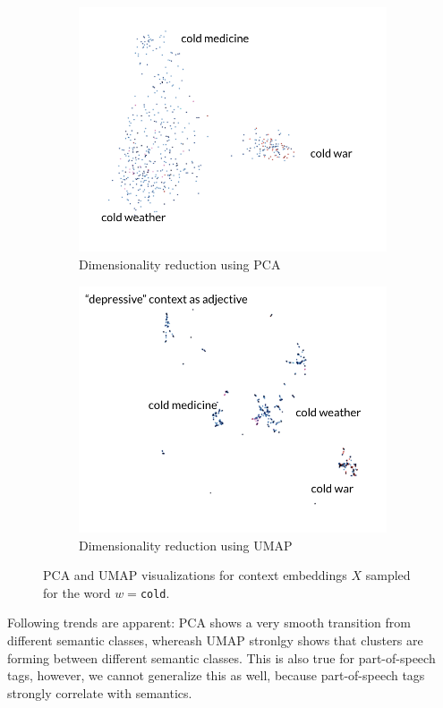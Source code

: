 \documentclass[a4paper,12pt,twoside,openright]{report}
\begin{document}
\begin{figure}[H]
\begin{subfigure}{.45\textwidth}
  \centering
  \includegraphics[width=.8\linewidth]{./assets/analysis/cold_pca.png}
  \caption{Dimensionality reduction using PCA}
  \label{fig:sfig1}
\end{subfigure}%
\hfill
\begin{subfigure}{.45\textwidth}
  \centering
  \includegraphics[width=.8\linewidth]{./assets/analysis/cold_umap.png}
  \caption{Dimensionality reduction using UMAP}
  \label{fig:sfig2}
\end{subfigure}
\caption{PCA and UMAP visualizations for context embeddings $X$ sampled for the word $w=$\texttt{cold}. }
\label{fig:cold_tensorboard}
\end{figure}


Following trends are apparent: 
PCA shows a very smooth transition from different semantic classes, whereash UMAP stronlgy shows that clusters are forming between different semantic classes.
This is also true for part-of-speech tags, however, we cannot generalize this as well, because part-of-speech tags strongly correlate with semantics.
\end{document}
